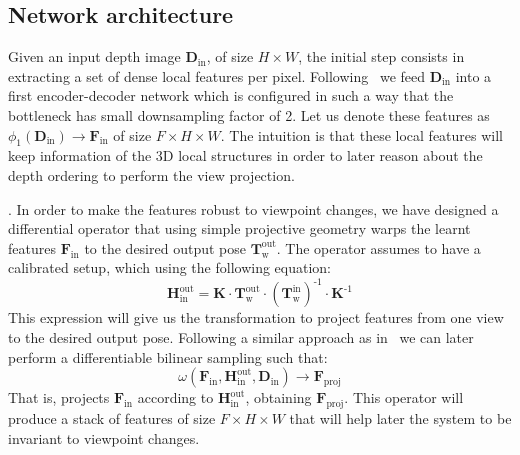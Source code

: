 \subsection{Network architecture}
Given an input depth image $\mathbf{D}_{\textrm{in}}$, of size $H\times W$, the initial step consists in extracting a set of dense local features per pixel. Following~\cite{pix2pix2017} we feed $\mathbf{D}_{\textrm{in}}$ into a first encoder-decoder network which is configured in such  a way that the bottleneck has  small downsampling factor of 2. Let us denote these features as $\phi_1(\mathbf{D}_{\textrm{in}}) \rightarrow \mathbf{F}_{\textrm{in}}$ of size $F\times H \times W$. The intuition is that these local features will keep information of the 3D local structures in order to later reason about the depth ordering to perform the view projection.

\vspace{1mm}
. In order to make the features robust to viewpoint changes, we have designed a differential operator that using simple projective geometry warps the learnt features $\mathbf{F}_{\textrm{in}}$ to the desired output pose $\mathbf{T}_{\textrm{w}}^{\textrm{out}}$. The operator assumes to have a calibrated setup, which using the following equation:
\begin{equation}
    \mathbf{H}_{\textrm{in}}^{\textrm{out}} = \mathbf{K} \cdot \mathbf{T}_{\textrm{w}}^{\textrm{out}} \cdot (\mathbf{T}_{\textrm{w}}^{\textrm{in}})^{\textrm{-1}} \cdot \mathbf{K}^{\textrm{-1}}
\end{equation}
This expression will give us the transformation to project features from one view to the desired output pose. Following a similar approach as in~\cite{NIPS2015_5854, eriba2020kornia} we can later perform a differentiable bilinear sampling such that:
 \begin{equation}
    \omega(\mathbf{F}_{\textrm{in}}, \mathbf{H}_{\textrm{in}}^{\textrm{out}}, \mathbf{D}_{\textrm{in}}) \rightarrow \mathbf{F}_{\textrm{proj}}
 \end{equation}
That is, projects $\mathbf{F}_{\textrm{in}}$ according to $\mathbf{H}_{\textrm{in}}^{\textrm{out}}$, obtaining $\mathbf{F}_{\textrm{proj}}$. This operator will produce a stack of features of size $F\times H \times W$ that will help later the system to be invariant to viewpoint changes.

